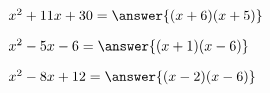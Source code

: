 \documentclass{ximera}
\begin{document}
  \begin{question}
  $x^2 + 11x + 30 = \answer{(x + 6)(x + 5)}$
  \end{question}
  \begin{question}
  $x^2 - 5x - 6 = \answer{(x + 1)(x - 6)}$
  \end{question}
  \begin{question}
  $x^2 - 8x + 12 = \answer{(x - 2)(x - 6)}$
  \end{question}
\end{document}
